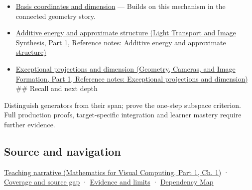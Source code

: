 \hypertarget{appendix-173b52c063ae-used-by}{}

\begin{itemize}
\item
  \hyperref[appendix-ce0341f7ea0d]{Basis coordinates and dimension} --- Builds on this mechanism in the connected geometry story.
\item
  \href{../04-Light-Transport-and-Image-Synthesis-P01/main.pdf\#appendix-b0732b22e7d6}{Additive energy and approximate structure (Light Transport and Image Synthesis, Part 1, Reference notes: Additive energy and approximate structure)}
\item
  \href{../03-Geometry-Cameras-and-Image-Formation-P01/main.pdf\#appendix-3c73f7862157}{Exceptional projections and dimension (Geometry, Cameras, and Image Formation, Part 1, Reference notes: Exceptional projections and dimension)} \#\# Recall and next depth
\end{itemize}

Distinguish generators from their span; prove the one-step subspace criterion. Full production proofs, target-specific integration and learner mastery require further evidence.

\subsection{Source and navigation}\label{appendix-173b52c063ae-source-and-navigation}

\hypertarget{appendix-173b52c063ae-source-and-navigation}{}

\href{../02-Mathematics-for-Visual-Computing-P01/main.pdf\#01-foundations-i-ch017-the-reachable-movements-form-a-vector-space}{Teaching narrative (Mathematics for Visual Computing, Part 1, Ch. 1)} · \hyperref[appendix-fd090d982a15-phase-6---parts-501-600]{Coverage and source gap} · \hyperref[appendix-a103e7846d21-phase-6---source-analysis-and-verification]{Evidence and limits} · \hyperref[appendix-4ad47bdd269a]{Dependency Map}
